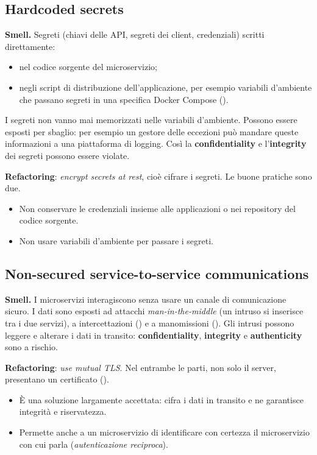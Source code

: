 \subsection{Hardcoded secrets}

\textbf{Smell.} Segreti (chiavi delle API, segreti dei client, credenziali) scritti direttamente:
\begin{itemize}
  \item nel codice sorgente del microservizio;
  \item negli script di distribuzione dell'applicazione, per esempio variabili d'ambiente che passano segreti in una
    specifica Docker Compose ().
\end{itemize}
I segreti non vanno mai memorizzati nelle variabili d'ambiente. Possono essere esposti per sbaglio: per esempio un
gestore delle eccezioni può mandare queste informazioni a una piattaforma di logging. Così la \textbf{confidentiality} e
l'\textbf{integrity} dei segreti possono essere violate.

\textbf{Refactoring}: \emph{encrypt secrets at rest}, cioè cifrare i segreti. Le buone pratiche sono due.
\begin{itemize}
  \item Non conservare le credenziali insieme alle applicazioni o nei repository del codice sorgente.
  \item Non usare variabili d'ambiente per passare i segreti.
\end{itemize}

\subsection{Non-secured service-to-service communications}

\textbf{Smell.} I microservizi interagiscono senza usare un canale di comunicazione sicuro. I dati sono esposti ad
attacchi \emph{man-in-the-middle} (un intruso si inserisce tra i due servizi), a intercettazioni ()
e a manomissioni (). Gli intrusi possono leggere e alterare i dati in transito: \textbf{confidentiality},
\textbf{integrity} e \textbf{authenticity} sono a rischio.

\textbf{Refactoring}: \emph{use mutual TLS}. Nel  entrambe le parti, non solo il server, presentano
un certificato ().
\begin{itemize}
  \item È una soluzione largamente accettata: cifra i dati in transito e ne garantisce integrità e riservatezza.
  \item Permette anche a un microservizio di identificare con certezza il microservizio con cui parla
    (\emph{autenticazione reciproca}).
\end{itemize}

